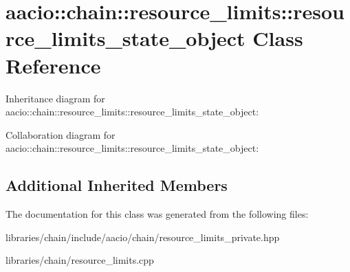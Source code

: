 \hypertarget{classaacio_1_1chain_1_1resource__limits_1_1resource__limits__state__object}{}\section{aacio\+:\+:chain\+:\+:resource\+\_\+limits\+:\+:resource\+\_\+limits\+\_\+state\+\_\+object Class Reference}
\label{classaacio_1_1chain_1_1resource__limits_1_1resource__limits__state__object}


Inheritance diagram for aacio\+:\+:chain\+:\+:resource\+\_\+limits\+:\+:resource\+\_\+limits\+\_\+state\+\_\+object\+:


Collaboration diagram for aacio\+:\+:chain\+:\+:resource\+\_\+limits\+:\+:resource\+\_\+limits\+\_\+state\+\_\+object\+:
\subsection*{Additional Inherited Members}


The documentation for this class was generated from the following files\+:\begin{DoxyCompactItemize}
\item 
libraries/chain/include/aacio/chain/resource\+\_\+limits\+\_\+private.\+hpp\item 
libraries/chain/resource\+\_\+limits.\+cpp\end{DoxyCompactItemize}
